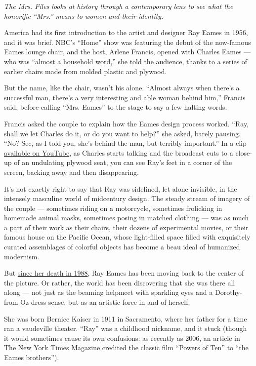 \emph{The Mrs. Files looks at history through a contemporary lens to see
what the honorific ``Mrs.'' means to women and their identity.}

America had its first introduction to the artist and designer Ray Eames
in 1956, and it was brief. NBC's ``Home'' show was featuring the debut
of the now-famous Eames lounge chair, and the host, Arlene Francis,
opened with Charles Eames --- who was ``almost a household word,'' she
told the audience, thanks to a series of earlier chairs made from molded
plastic and plywood.

But the name, like the chair, wasn't his alone. ``Almost always when
there's a successful man, there's a very interesting and able woman
behind him,'' Francis said, before calling ``Mrs. Eames'' to the stage
to say a few halting words.

Francis asked the couple to explain how the Eames design process worked.
``Ray, shall we let Charles do it, or do you want to help?'' she asked,
barely pausing. ``No? See, as I told you, she's behind the man, but
terribly important.'' In a clip
\href{https://www.youtube.com/watch?v=z_X6RsN-HFw}{available on
YouTube}, as Charles starts talking and the broadcast cuts to a close-up
of an undulating plywood seat, you can see Ray's feet in a corner of the
screen, backing away and then disappearing.

It's not exactly right to say that Ray was sidelined, let alone
invisible, in the intensely masculine world of midcentury design. The
steady stream of imagery of the couple --- sometimes riding on a
motorcycle, sometimes frolicking in homemade animal masks, sometimes
posing in matched clothing --- was as much a part of their work as their
chairs, their dozens of experimental movies, or their famous house on
the Pacific Ocean, whose light-filled space filled with exquisitely
curated assemblages of colorful objects has become a beau ideal of
humanized modernism.

But
\href{https://www.nytimes3xbfgragh.onion/1988/08/23/obituaries/ray-eames-72-a-founder-of-firm-that-designed-the-eames-chair.html}{since
her death in 1988}, Ray Eames has been moving back to the center of the
picture. Or rather, the world has been discovering that she was there
all along --- not just as the beaming helpmeet with sparkling eyes and a
Dorothy-from-Oz dress sense, but as an artistic force in and of herself.

She was born Bernice Kaiser in 1911 in Sacramento, where her father for
a time ran a vaudeville theater. ``Ray'' was a childhood nickname, and
it stuck (though it would sometimes cause its own confusions: as
recently as 2006, an article in The New York Times Magazine credited the
classic film ``Powers of Ten'' to ``the Eames brothers'').

